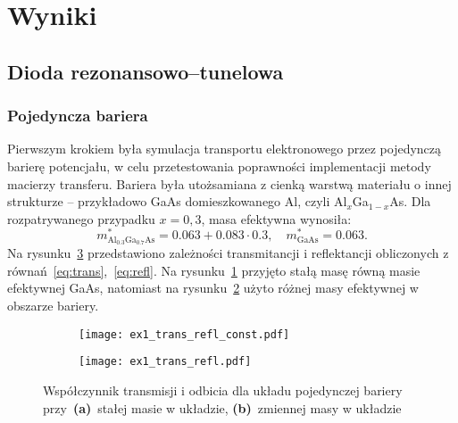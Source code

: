 \documentclass{article}
\begin{document}
\section{Wyniki}
\subsection{Dioda rezonansowo--tunelowa}
\subsubsection{Pojedyncza bariera}
Pierwszym krokiem była symulacja transportu elektronowego przez pojedynczą barierę potencjału, w celu przetestowania poprawności implementacji metody macierzy transferu.
Bariera była utożsamiana z cienką warstwą materiału o innej strukturze – przykładowo GaAs domieszkowanego Al, czyli Al$_{x}$Ga$_{1-x}$As. Dla rozpatrywanego przypadku $x = 0{,}3$, masa efektywna wynosiła:
\[
m^*_{\text{Al}_{0.3}\text{Ga}_{0.7}\text{As}} = 0.063 + 0.083 \cdot 0.3,
\quad
m^*_{\text{GaAs}} = 0.063.
\]
Na rysunku~\ref{fig:ex1 trans refl} przedstawiono zależności transmitancji i reflektancji obliczonych z równań~\eqref{eq:trans},~\eqref{eq:refl}. 
Na rysunku~\ref{fig:ex1 const mass} przyjęto stałą masę równą masie efektywnej GaAs, natomiast na rysunku~\ref{fig:ex1 non const mass} użyto różnej masy efektywnej w obszarze bariery.\\
\begin{figure}[htp!]
    \centering
\begin{subfigure}{.495\textwidth}
    \texttt{[image: ex1\_trans\_refl\_const.pdf]}
    \caption{}
    \label{fig:ex1 const mass}
\end{subfigure}
\begin{subfigure}{.495\textwidth}
    \texttt{[image: ex1\_trans\_refl.pdf]}
    \caption{}
    \label{fig:ex1 non const mass}
\end{subfigure}
\caption{Współczynnik transmisji i odbicia dla układu pojedynczej bariery przy~\textbf{(a)}~stałej masie w układzie, \textbf{(b)}~zmiennej masy w układzie}
\label{fig:ex1 trans refl}
\end{figure}
\end{document}
